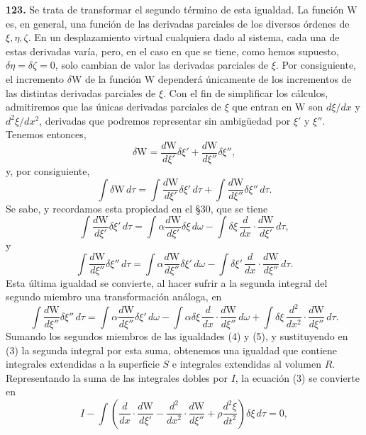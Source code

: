\noindent\textbf{123.} Se trata de transformar el segundo término de esta
igualdad. La función $\mathrm{W}$ es, en general, una función de las derivadas
parciales de los diversos órdenes de $\xi,\eta,\zeta$. En un desplazamiento
virtual cualquiera dado al sistema, cada una de estas derivadas varía,
pero, en el caso en que se tiene, como hemos supuesto, $\delta\eta=\delta\zeta=0$,
solo cambian de valor las derivadas parciales de $\xi$. Por consiguiente,
el incremento $\delta \mathrm{W}$ de la función $\mathrm{W}$ dependerá únicamente de los
incrementos de las distintas derivadas parciales de $\xi$. Con el fin de
simplificar los cálculos, admitiremos que las únicas derivadas parciales de
$\xi$ que entran en $\mathrm{W}$ son $d\xi/dx$ y $d^2\xi/dx^2$, derivadas que
podremos representar sin ambigüedad por $\xi'$ y $\xi''$. Tenemos
entonces,
\[
\delta \mathrm{W} = \frac{d\mathrm{W}}{d\xi'}\delta\xi' + \frac{d\mathrm{W}}{d\xi''}\delta\xi'',
\]
y, por consiguiente,
\[
\int\delta \mathrm{W}\,d\tau = \int\frac{d\mathrm{W}}{d\xi'}\delta\xi'\,d\tau
+\int\frac{d\mathrm{W}}{d\xi''}\delta\xi''\,d\tau.
\]
Se sabe, y recordamos esta propiedad en el §30, que se tiene
\begin{equation}
\int\frac{d\mathrm{W}}{d\xi'}\delta\xi'\,d\tau
=\int\alpha\frac{d\mathrm{W}}{d\xi'}\delta\xi\,d\omega
-\int\delta\xi\,\frac{d}{dx}\cdot\frac{d\mathrm{W}}{d\xi'}\,d\tau,
\tag{4}
\end{equation}
y
\[
\int\frac{d\mathrm{W}}{d\xi''}\delta\xi''\,d\tau
=\int\alpha\frac{d\mathrm{W}}{d\xi''}\delta\xi'\,d\omega
-\int\delta\xi'\,\frac{d}{dx}\cdot\frac{d\mathrm{W}}{d\xi''}\,d\tau.
\]
Esta última igualdad se convierte, al hacer sufrir a la segunda integral
del segundo miembro una transformación análoga, en
\begin{equation}
\int\frac{d\mathrm{W}}{d\xi''}\delta\xi''\,d\tau
=\int\alpha\frac{d\mathrm{W}}{d\xi''}\delta\xi'\,d\omega
-\int\alpha\delta\xi\,\frac{d}{dx}\cdot\frac{d\mathrm{W}}{d\xi''}\,d\omega
+\int\delta\xi\,\frac{d^2}{dx^2}\cdot\frac{d\mathrm{W}}{d\xi''}\,d\tau.
\tag{5}
\end{equation}
Sumando los segundos miembros de las igualdades (4) y (5), y sustituyendo
en (3) la segunda integral por esta suma, obtenemos una igualdad que
contiene integrales extendidas a la superficie $S$ e integrales extendidas
al volumen $R$. Representando la suma de las integrales dobles por $I$, la
ecuación (3) se convierte en
\[
I - \int\left(\frac{d}{dx}\cdot\frac{d\mathrm{W}}{d\xi'}
-\frac{d^2}{dx^2}\cdot\frac{d\mathrm{W}}{d\xi''}+\rho\frac{d^2\xi}{dt^2}\right)\delta\xi\,d\tau=0,
\]
